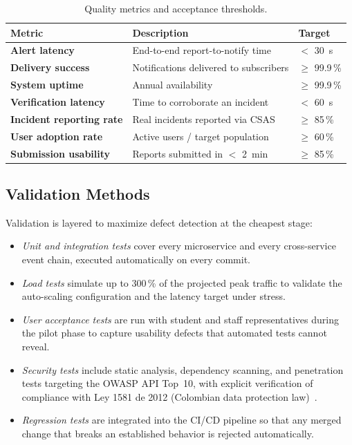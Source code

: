 \documentclass[conference,a4paper,10pt]{IEEEtran}
\begin{document}
\begin{table}[H]
\centering
\caption{Quality metrics and acceptance thresholds.}
\label{tab:metrics}
\renewcommand{\arraystretch}{1.2}
\footnotesize
\begin{tabularx}{\columnwidth}{>{\bfseries}lXl}
\toprule
\rowcolor{tableheader} Metric & Description & Target \\
\midrule
Alert latency & End-to-end report-to-notify time & $<$ 30~s \\
Delivery success & Notifications delivered to subscribers & $\geq$ 99.9\,\% \\
System uptime & Annual availability & $\geq$ 99.9\,\% \\
Verification latency & Time to corroborate an incident & $<$ 60~s \\
Incident reporting rate & Real incidents reported via CSAS & $\geq$ 85\,\% \\
User adoption rate & Active users / target population & $\geq$ 60\,\% \\
Submission usability & Reports submitted in $<$ 2~min & $\geq$ 85\,\% \\
\bottomrule
\end{tabularx}
\end{table}

\subsection{Validation Methods}

Validation is layered to maximize defect detection at the cheapest stage:

\begin{itemize}[leftmargin=*]
  \item \emph{Unit and integration tests} cover every microservice and
  every cross-service event chain, executed automatically on every commit.
  \item \emph{Load tests} simulate up to 300\,\% of the projected peak
  traffic to validate the auto-scaling configuration and the latency target
  under stress.
  \item \emph{User acceptance tests} are run with student and staff
  representatives during the pilot phase to capture usability defects that
  automated tests cannot reveal.
  \item \emph{Security tests} include static analysis, dependency scanning,
  and penetration tests targeting the OWASP API Top~10, with explicit
  verification of compliance with Ley 1581 de 2012 (Colombian data
  protection law)~\cite{ley1581}.
  \item \emph{Regression tests} are integrated into the CI/CD pipeline so
  that any merged change that breaks an established behavior is rejected
  automatically.
\end{itemize}
\end{document}
